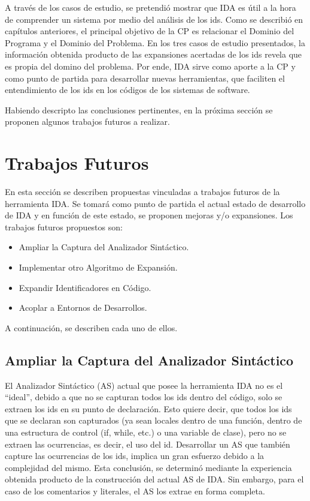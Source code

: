 A través de los casos de estudio, se pretendió mostrar que IDA es útil a la hora de comprender un sistema por medio del análisis de los ids. Como se describió en capítulos anteriores, el principal objetivo de la CP es relacionar el Dominio del Programa y el Dominio del Problema. En los tres casos de estudio presentados, la información obtenida producto de las expansiones acertadas de los ids revela que es propia del domino del problema. Por ende, IDA sirve como aporte a la CP y como punto de partida para desarrollar nuevas herramientas, que faciliten el entendimiento de los ids en los códigos de los sistemas de software.

Habiendo descripto las conclusiones pertinentes, en la próxima sección se proponen algunos trabajos futuros a realizar.

\section{Trabajos Futuros}

En esta sección se describen propuestas vinculadas a trabajos futuros de la herramienta IDA. Se tomará como punto de partida el actual estado de desarrollo de IDA y en función de este estado, se proponen mejoras y/o expansiones. Los trabajos futuros propuestos son:

\begin{itemize}

\item Ampliar la Captura del Analizador Sintáctico.

\item Implementar otro Algoritmo de Expansión.

\item Expandir Identificadores en Código.

\item Acoplar a Entornos de Desarrollos.

\end{itemize}

A continuación, se describen cada uno de ellos.

\subsection{Ampliar la Captura del Analizador Sintáctico}

El Analizador Sintáctico (AS) actual que posee la herramienta IDA no es el “ideal”, debido a que no se capturan todos los ids dentro del código, solo se extraen los ids en su punto de declaración.
Esto quiere decir, que todos los ids que se declaran son capturados (ya sean locales dentro de una función, dentro de una estructura de control (if, while, etc.) o una variable de clase), pero no se extraen las ocurrencias, es decir, el uso del id. 
Desarrollar un AS que también capture las ocurrencias de los ids, implica un gran esfuerzo debido a la complejidad del mismo. Esta conclusión, se determinó mediante la experiencia obtenida producto de la construcción del actual AS de IDA. Sin embargo, para el caso de los comentarios y literales, el AS los extrae en forma completa. 

